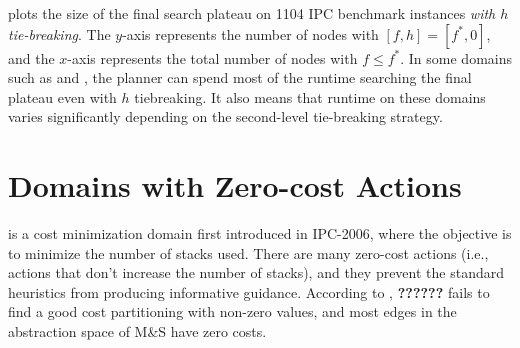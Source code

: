  plots the size of the final search plateau on 1104 IPC
benchmark instances \emph{with $h$ tie-breaking}.
The $y$-axis
represents the number of nodes with $[f,h]=[f^*,0]$, and the $x$-axis represents the total
number of nodes with $f\leq f^*$.
In some domains such as  and , the planner can spend most of the runtime
searching the final plateau even with $h$ tiebreaking.
It also
means that runtime on these domains varies significantly depending on the second-level tie-breaking strategy.




\section{Domains with Zero-cost Actions}
\label{sec:zerocost-domains}
  is a cost
minimization domain first introduced in IPC-2006, where the objective is to 
minimize the number of stacks used.
There are many zero-cost actions (i.e., actions that don't increase the number of stacks), and
they prevent the standard heuristics from producing
informative guidance.
According to \cite{richter2010lama}, \textbf{??????}
\lmcut \cite{Helmert2009} fails to find a good cost
partitioning with non-zero values, 
and most edges in the abstraction
space of M\&S \cite{helmert2007flexible} have zero costs.


